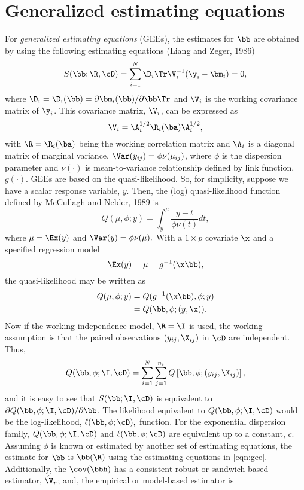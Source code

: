 \documentclass{article}
\begin{document}
\section*{Generalized estimating equations}
\noindent For \textit{generalized estimating equations} (GEEs), the estimates for $\bb$ are obtained by using the following estimating equations (Liang and Zeger, 1986)
\begin{equation}
  \label{eqn:gee}
  S(\bb; \R, \cD) = \sum_{i = 1}^{N}\D_{i}\Tr\V_{i}^{-1}(\y_{i} - \bm_{i}) = 0,
\end{equation}
where $\D_{i} = \D_{i}(\bb) = \partial\bm_{i}(\bb)/\partial\bb\Tr$ and $\V_{i}$ is the working covariance matrix of $\y_{i}$. This covariance matrix, $\V_{i}$, can be expressed as
\begin{equation*}
  \V_{i} = \A_{i}^{1/2}\R_{i}(\ba)\A_{i}^{1/2},
\end{equation*}
with $\R = \R_{i}(\ba)$ being the working correlation matrix and $\A_{i}$ is a diagonal matrix of marginal variance, $\Var(y_{ij}) = \phi\nu(\mu_{ij})$, where $\phi$ is the dispersion parameter and $\nu(\cdot)$ is mean-to-variance relationship defined by link function, $g(\cdot)$. GEEs are based on the quasi-likelihood. So, for simplicity, suppose we have a scalar response variable, $y$. Then, the (log) quasi-likelihood function defined by McCullagh and Nelder, 1989 is
\begin{equation}
  \label{eqn:qfn}
  Q(\mu, \phi; y) = \int_{y}^{\mu} \frac{y - t}{\phi\nu(t)}dt,
\end{equation}
where $\mu = \Ex(y)$ and $\Var(y) = \phi\nu(\mu).$ With a $1 \times p$ covariate $\x$ and a specified regression model
\begin{equation*}
  \Ex(y) = \mu = g^{-1}(\x\bb),
\end{equation*}
the quasi-likelihood may be written as
\begin{align*}
  Q(\mu, \phi; y) &= Q(g^{-1}(\x\bb), \phi; y) \\
  &= Q(\bb, \phi; (y, \x)).
\end{align*}
Now if the working independence model, $\R = \I$ is used, the working assumption is that the paired observations $(y_{ij}, \X_{ij})$ in $\cD$ are independent. Thus,
\begin{equation}
  \label{eqn:qbeta}
  Q(\bb, \phi; \I, \cD) = \sum_{i = 1}^{N}\sum_{j = 1}^{n_{i}}Q\left[\bb, \phi; (y_{ij}, \X_{ij})\right],
\end{equation}
and it is easy to see that $S(\bb; \I, \cD)$ is equivalent to $\partial Q(\bb, \phi; \I, \cD)/\partial\bb$. The likelihood equivalent to $Q(\bb, \phi; \I, \cD)$ would be the log-likelihood, $\ell(\bb, \phi; \cD),$ function. For the exponential dispersion family, $Q(\bb, \phi; \I, \cD)$ and $\ell(\bb, \phi; \cD)$ are equivalent up to a constant, $c$. Assuming $\phi$ is known or estimated by another set of estimating equations, the estimate for $\bb$ is $\bb(\R)$ using the estimating equations in \ref{eqn:gee}. Additionally, the $\cov(\bbh)$ has a consistent robust or sandwich based estimator, $\hat{\V}_{r}$; and, the empirical or model-based estimator is
\end{document}
